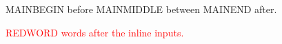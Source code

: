 \documentclass{article}
\begin{document}
MAINBEGIN before  MAINMIDDLE between  MAINEND after.

\textcolor{red}{REDWORD words after the inline inputs.}
\end{document}
